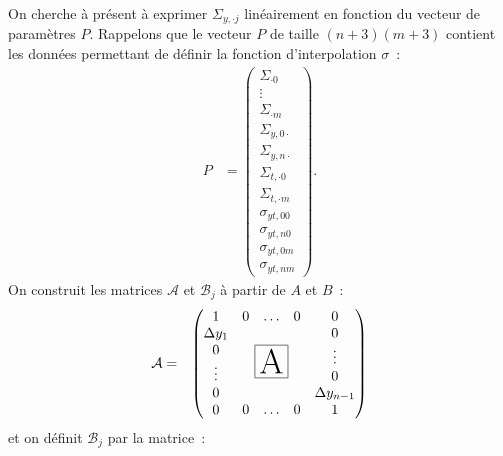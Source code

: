 On cherche \`a pr\'esent \`a exprimer $\Sigma_{y,\cdot j}$ 
lin\'eairement en fonction du vecteur de param\`etres $P$. Rappelons 
que le vecteur $P$ de taille $(n+3)(m+3)$ 
contient les donn\'ees permettant de d\'efinir la fonction 
d'interpolation $\sigma$~:
\begin{eqnarray*}
P &= \begin{pmatrix}
\Sigma_{\cdot 0}\\ \vdots \\ \Sigma_{\cdot m} \\ 
\Sigma_{y,0\cdot} \\ 
\Sigma_{y,n\cdot} \\ \Sigma_{t,\cdot 0} \\ 
\Sigma_{t,\cdot m} \\ \sigma_{yt,00} \\ \sigma_{yt,n0} \\ 
\sigma_{yt,0m} \\ \sigma_{yt,nm}\end{pmatrix}.
\end{eqnarray*}
On construit les matrices $\mathcal{A}$ et $\mathcal{B}_j$ \`a partir 
de $A$ et $B$~:
\setlength{\fboxsep}{24pt}
\begin{eqnarray*}
\mathcal{A} &=& \begin{pmatrix} 
1 & \begin{matrix} 0 &\ldots & 0 \end{matrix} & 0\\
\begin{matrix} \Delta y_1\\0\\ \vdots\\0 \end{matrix} & 
\raisebox{-1ex}{\fbox{\Huge A}} & \begin{matrix} 0\\ \vdots\\0 \\ 
\Delta y_{n-1} \end{matrix}\\
0 &  \begin{matrix}0 &\ldots &0 \end{matrix} & 1
\end{pmatrix}
\end{eqnarray*}
et on d\'efinit $\mathcal{B}_j$ par la matrice~: 
\setlength{\fboxsep}{31.8pt}
\setcounter{MaxMatrixCols}{20}

